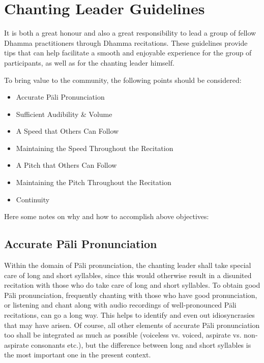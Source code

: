 \section{Chanting Leader Guidelines}

\begin{justify}
It is both a great honour and also a great responsibility to lead a group of fellow Dhamma practitioners through Dhamma recitations. These guidelines provide tips that can help facilitate a smooth and enjoyable experience for the group of participants, as well as for the chanting leader himself.
\end{justify}

To bring value to the community, the following points should be considered:
\begin{itemize}
\item Accurate Pāli Pronunciation
\item Sufficient Audibility \& Volume
\item A Speed that Others Can Follow
\item Maintaining the Speed Throughout the Recitation
\item A Pitch that Others Can Follow
\item Maintaining the Pitch Throughout the Recitation
\item Continuity
\end{itemize}
Here some notes on why and how to accomplish above objectives:

\subsection*{Accurate Pāli Pronunciation}
\begin{justify}
Within the domain of Pāli pronunciation, the chanting leader shall take special care of long and short syllables, since this would otherwise result in a disunited recitation with those who do take care of long and short syllables. To obtain good Pāli pronunciation, frequently chanting with those who have good pronunciation, or listening and chant along with audio recordings of well-pronounced Pāli recitations, can go a long way. This helps to identify and even out idiosyncrasies that may have arisen. Of course, all other elements of accurate Pāli pronunciation too shall be integrated as much as possible (voiceless vs. voiced, aspirate vs. non-aspirate consonants etc.), but the difference between long and short syllables is the most important one in the present context.
\end{justify}

